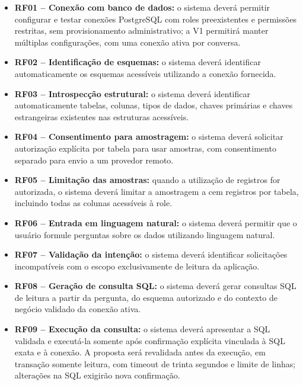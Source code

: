 \begin{itemize}

    \item \textbf{RF01 -- Conexão com banco de dados:}
    o sistema deverá permitir configurar e testar conexões PostgreSQL com roles preexistentes e permissões restritas, sem provisionamento administrativo; a V1 permitirá manter múltiplas configurações, com uma conexão ativa por conversa.

    \item \textbf{RF02 -- Identificação de esquemas:}
    o sistema deverá identificar automaticamente os esquemas acessíveis utilizando a conexão fornecida.

    \item \textbf{RF03 -- Introspecção estrutural:}
    o sistema deverá identificar automaticamente tabelas, colunas, tipos de dados, chaves primárias e chaves estrangeiras existentes nas estruturas acessíveis.

    \item \textbf{RF04 -- Consentimento para amostragem:}
    o sistema deverá solicitar autorização explícita por tabela para usar amostras, com consentimento separado para envio a um provedor remoto.

    \item \textbf{RF05 -- Limitação das amostras:}
    quando a utilização de registros for autorizada, o sistema deverá limitar a amostragem a cem registros por tabela, incluindo todas as colunas acessíveis à role.

    \item \textbf{RF06 -- Entrada em linguagem natural:}
    o sistema deverá permitir que o usuário formule perguntas sobre os dados utilizando linguagem natural.

    \item \textbf{RF07 -- Validação da intenção:}
    o sistema deverá identificar solicitações incompatíveis com o escopo exclusivamente de leitura da aplicação.

    \item \textbf{RF08 -- Geração de consulta SQL:}
    o sistema deverá gerar consultas SQL de leitura a partir da pergunta, do esquema autorizado e do contexto de negócio validado da conexão ativa.

    \item \textbf{RF09 -- Execução da consulta:}
    o sistema deverá apresentar a SQL validada e executá-la somente após confirmação explícita vinculada à SQL exata e à conexão. A proposta será revalidada antes da execução, em transação somente leitura, com timeout de trinta segundos e limite de linhas; alterações na SQL exigirão nova confirmação.


\end{itemize}

